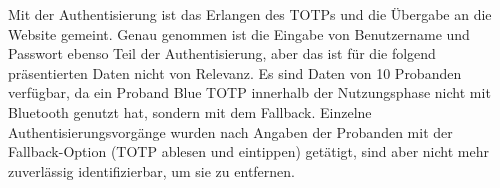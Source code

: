 Mit der Authentisierung ist das Erlangen des TOTPs und die Übergabe an die Website 
gemeint. Genau genommen ist die Eingabe von Benutzername und Passwort ebenso Teil der 
Authentisierung, aber das ist für die folgend präsentierten Daten nicht von Relevanz. 
Es sind Daten von 10 Probanden verfügbar, da ein Proband Blue TOTP innerhalb der 
Nutzungsphase nicht mit Bluetooth genutzt hat, sondern mit dem Fallback. Einzelne Authentisierungsvorgänge 
wurden nach Angaben der Probanden 
mit der Fallback-Option (TOTP ablesen und eintippen) getätigt, sind aber nicht mehr 
zuverlässig identifizierbar, um sie zu entfernen.